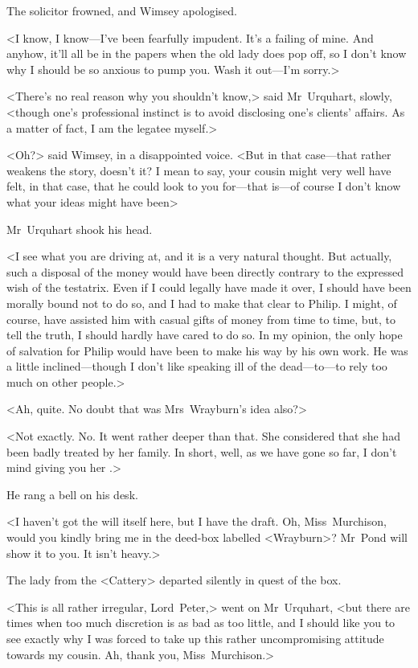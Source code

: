 The solicitor frowned, and Wimsey apologised.

<I know, I know—I've been fearfully impudent. It's a failing of mine. And anyhow, it'll all be in the papers when the old lady does pop off, so I don't know why I should be so anxious to pump you. Wash it out—I'm sorry.>

<There's no real reason why you shouldn't know,> said Mr~Urquhart, slowly, <though one's professional instinct is to avoid disclosing one's clients' affairs. As a matter of fact, I am the legatee myself.>

<Oh?> said Wimsey, in a disappointed voice. <But in that case—that rather weakens the story, doesn't it? I mean to say, your cousin might very well have felt, in that case, that he could look to you for—that is—of course I don't know what your ideas might have been\longdash>

Mr~Urquhart shook his head.

<I see what you are driving at, and it is a very natural thought. But actually, such a disposal of the money would have been directly contrary to the expressed wish of the testatrix. Even if I could legally have made it over, I should have been morally bound not to do so, and I had to make that clear to Philip. I might, of course, have assisted him with casual gifts of money from time to time, but, to tell the truth, I should hardly have cared to do so. In my opinion, the only hope of salvation for Philip would have been to make his way by his own work. He was a little inclined—though I don't like speaking ill of the dead—to—to rely too much on other people.>

<Ah, quite. No doubt that was Mrs~Wrayburn's idea also?>

<Not exactly. No. It went rather deeper than that. She considered that she had been badly treated by her family. In short, well, as we have gone so far, I don't mind giving you her .>

He rang a bell on his desk.

<I haven't got the will itself here, but I have the draft. Oh, Miss~Murchison, would you kindly bring me in the deed-box labelled <Wrayburn>? Mr~Pond will show it to you. It isn't heavy.>

The lady from the <Cattery> departed silently in quest of the box.

<This is all rather irregular, Lord~Peter,> went on Mr~Urquhart, <but there are times when too much discretion is as bad as too little, and I should like you to see exactly why I was forced to take up this rather uncompromising attitude towards my cousin. Ah, thank you, Miss~Murchison.>

